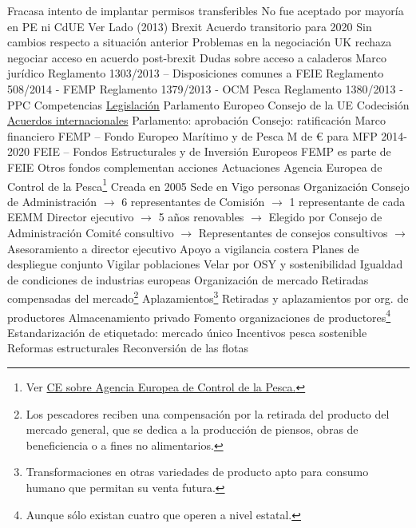 \documentclass{nuevotema}
\begin{document}
\begin{esquemal}
				\4 Fracasa intento de implantar permisos transferibles
				\4[] No fue aceptado por mayoría en PE ni CdUE
				\4 Ver Lado (2013)
			\3 Brexit
				\4 Acuerdo transitorio para 2020
				\4[] Sin cambios respecto a situación anterior
				\4 Problemas en la negociación
				\4[] UK rechaza negociar acceso en acuerdo post-brexit
				\4[] Dudas sobre acceso a caladeros
		\2 Marco jurídico
			\3 Reglamento 1303/2013 -- Disposiciones comunes a FEIE
			\3 Reglamento 508/2014 - FEMP
			\3 Reglamento 1379/2013 - OCM Pesca
			\3 Reglamento 1380/2013 - PPC
			\3 Competencias
				\4[] \underline{Legislación}
				\4 Parlamento Europeo
				\4 Consejo de la UE
				\4[$\then$] Codecisión
				\4[] \underline{Acuerdos internacionales}
				\4 Parlamento: aprobación
				\4 Consejo: ratificación
		\2 Marco financiero
			\3 FEMP -- Fondo Europeo Marítimo y de Pesca
				 M de € para MFP 2014-2020
			\3 FEIE -- Fondos Estructurales y de Inversión Europeos
				\4 FEMP es parte de FEIE
				\4 Otros fondos complementan acciones
		\2 Actuaciones
			\3 Agencia Europea de Control de la Pesca\footnote{Ver \href{https://europa.eu/european-union/about-eu/agencies/efca_es}{CE sobre Agencia Europea de Control de la Pesca.}}
				\4 Creada en 2005
				\4 Sede en Vigo
				\4 63 personas
				\4 Organización
				\4[] Consejo de Administración
				\4[] $\to$ 6 representantes de Comisión
				\4[] $\to$ 1 representante de cada EEMM
				\4[] Director ejecutivo
				\4[] $\to$ 5 años renovables
				\4[] $\to$ Elegido por Consejo de Administración
				\4[] Comité consultivo
				\4[] $\to$ Representantes de consejos consultivos
				\4[] $\to$ Asesoramiento a director ejecutivo
				\4 Apoyo a vigilancia costera
				\4 Planes de despliegue conjunto
				\4[] Vigilar poblaciones
				\4[] Velar por OSY y sostenibilidad
				\4 Igualdad de condiciones de industrias europeas
			\3 Organización de mercado
				\4 Retiradas compensadas del mercado\footnote{Los pescadores reciben una compensación por la retirada del producto del mercado general, que se dedica a la producción de piensos, obras de beneficiencia o a fines no alimentarios.}
				\4 Aplazamientos\footnote{Transformaciones en otras variedades de producto apto para consumo humano que permitan su venta futura.}
				\4 Retiradas y aplazamientos por org. de productores
				\4 Almacenamiento privado
				\4 Fomento organizaciones de productores\footnote{Aunque sólo existan cuatro que operen a nivel estatal.}
				\4 Estandarización de etiquetado: mercado único
				\4 Incentivos pesca sostenible
			\3 Reformas estructurales
				\4 Reconversión de las flotas

\end{esquemal}
\end{document}
